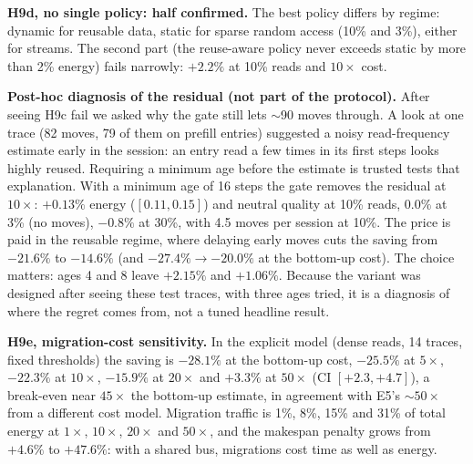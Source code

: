 \textbf{H9d, no single policy: half confirmed.} The best policy differs by regime: dynamic for reusable data, static for sparse random access (10\% and 3\%), either for streams. The second part (the reuse-aware policy never exceeds static by more than 2\% energy) fails narrowly: $+2.2\%$ at 10\% reads and $10\times$ cost.

\textbf{Post-hoc diagnosis of the residual (not part of the protocol).} After seeing H9c fail we asked why the gate still lets $\sim$90 moves through. A look at one trace (82 moves, 79 of them on prefill entries) suggested a noisy read-frequency estimate early in the session: an entry read a few times in its first steps looks highly reused. Requiring a minimum age before the estimate is trusted tests that explanation. With a minimum age of 16 steps the gate removes the residual at $10\times$: $+0.13\%$ energy ($[0.11,0.15]$) and neutral quality at 10\% reads, $0.0\%$ at 3\% (no moves), $-0.8\%$ at 30\%, with 4.5 moves per session at 10\%. The price is paid in the reusable regime, where delaying early moves cuts the saving from $-21.6\%$ to $-14.6\%$ (and $-27.4\%\to-20.0\%$ at the bottom-up cost). The choice matters: ages 4 and 8 leave $+2.15\%$ and $+1.06\%$. Because the variant was designed after seeing these test traces, with three ages tried, it is a diagnosis of where the regret comes from, not a tuned headline result.

\textbf{H9e, migration-cost sensitivity.} In the explicit model (dense reads, 14 traces, fixed thresholds) the saving is $-28.1\%$ at the bottom-up cost, $-25.5\%$ at $5\times$, $-22.3\%$ at $10\times$, $-15.9\%$ at $20\times$ and $+3.3\%$ at $50\times$ (CI $[+2.3,+4.7]$), a break-even near $45\times$ the bottom-up estimate, in agreement with E5's $\sim\!50\times$ from a different cost model. Migration traffic is 1\%, 8\%, 15\% and 31\% of total energy at $1\times$, $10\times$, $20\times$ and $50\times$, and the makespan penalty grows from $+4.6\%$ to $+47.6\%$: with a shared bus, migrations cost time as well as energy.

